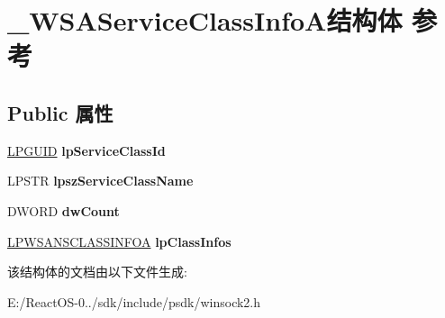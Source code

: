 \hypertarget{struct___w_s_a_service_class_info_a}{}\section{\+\_\+\+W\+S\+A\+Service\+Class\+Info\+A结构体 参考}
\label{struct___w_s_a_service_class_info_a}
\subsection*{Public 属性}
\begin{DoxyCompactItemize}
\item 
\mbox{\label{struct___w_s_a_service_class_info_a_a27ae259783bb4a385a90acf96f6b03d8}} 
\hyperlink{interface_g_u_i_d}{L\+P\+G\+U\+ID} {\bfseries lp\+Service\+Class\+Id}
\item 
\mbox{\label{struct___w_s_a_service_class_info_a_a21586c677f8fe4943bb339d2665dc384}} 
L\+P\+S\+TR {\bfseries lpsz\+Service\+Class\+Name}
\item 
\mbox{\label{struct___w_s_a_service_class_info_a_a2ea0895e18f3c7e7d0ead8c7169b3d19}} 
D\+W\+O\+RD {\bfseries dw\+Count}
\item 
\mbox{\label{struct___w_s_a_service_class_info_a_a8309819e535f95756c6769f125ee3a3b}} 
\hyperlink{struct___w_s_a_n_s_class_info_a}{L\+P\+W\+S\+A\+N\+S\+C\+L\+A\+S\+S\+I\+N\+F\+OA} {\bfseries lp\+Class\+Infos}
\end{DoxyCompactItemize}


该结构体的文档由以下文件生成\+:\begin{DoxyCompactItemize}
\item 
E\+:/\+React\+O\+S-\/0../sdk/include/psdk/winsock2.\+h\end{DoxyCompactItemize}
